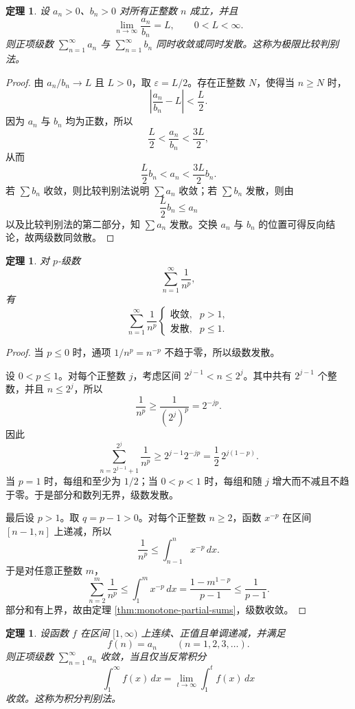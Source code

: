 \documentclass[UTF8,fontset=fandol,11pt]{ctexart}
\newtheorem{theorem}[definition]{定理}
\begin{document}
\begin{theorem}
设 $a_n>0$、$b_n>0$ 对所有正整数 $n$ 成立，并且
\[
\lim_{n\to\infty}\frac{a_n}{b_n}=L,
\qquad 0<L<\infty.
\]
则正项级数 $\sum_{n=1}^{\infty}a_n$ 与 $\sum_{n=1}^{\infty}b_n$ 同时收敛或同时发散。这称为极限比较判别法。\label{thm:limit-comparison}
\end{theorem}
\begin{proof}
由 $a_n/b_n\to L$ 且 $L>0$，取 $\varepsilon=L/2$。存在正整数 $N$，使得当 $n\geq N$ 时，
\[
\left|\frac{a_n}{b_n}-L\right|<\frac{L}{2}.
\]
因为 $a_n$ 与 $b_n$ 均为正数，所以
\[
\frac{L}{2}<\frac{a_n}{b_n}<\frac{3L}{2},
\]
从而
\[
\frac{L}{2}b_n<a_n<\frac{3L}{2}b_n.
\]
若 $\sum b_n$ 收敛，则比较判别法说明 $\sum a_n$ 收敛；若 $\sum b_n$ 发散，则由
\[
\frac{L}{2}b_n\leq a_n
\]
以及比较判别法的第二部分，知 $\sum a_n$ 发散。交换 $a_n$ 与 $b_n$ 的位置可得反向结论，故两级数同敛散。
\end{proof}
\begin{theorem}
对 $p$-级数
\[
\sum_{n=1}^{\infty}\frac{1}{n^p},
\]
有
\[
\sum_{n=1}^{\infty}\frac{1}{n^p}
\begin{cases}
\text{收敛},&p>1,\\
\text{发散},&p\leq1.
\end{cases}
\]
\label{thm:p-series}
\end{theorem}
\begin{proof}
当 $p\leq0$ 时，通项 $1/n^p=n^{-p}$ 不趋于零，所以级数发散。

设 $0<p\leq1$。对每个正整数 $j$，考虑区间 $2^{j-1}<n\leq2^j$。其中共有 $2^{j-1}$ 个整数，并且 $n\leq2^j$，所以
\[
\frac{1}{n^p}\geq\frac{1}{(2^j)^p}=2^{-jp}.
\]
因此
\[
\sum_{n=2^{j-1}+1}^{2^j}\frac{1}{n^p}
\geq 2^{j-1}2^{-jp}=\frac12\,2^{j(1-p)}.
\]
当 $p=1$ 时，每组和至少为 $1/2$；当 $0<p<1$ 时，每组和随 $j$ 增大而不减且不趋于零。于是部分和数列无界，级数发散。

最后设 $p>1$。取 $q=p-1>0$。对每个正整数 $n\geq2$，函数 $x^{-p}$ 在区间 $[n-1,n]$ 上递减，所以
\[
\frac{1}{n^p}\leq\int_{n-1}^{n}x^{-p}\,dx.
\]
于是对任意正整数 $m$，
\[
\sum_{n=2}^{m}\frac{1}{n^p}
\leq\int_{1}^{m}x^{-p}\,dx
=\frac{1-m^{1-p}}{p-1}
\leq\frac{1}{p-1}.
\]
部分和有上界，故由定理 \ref{thm:monotone-partial-sums}，级数收敛。
\end{proof}
\begin{theorem}
设函数 $f$ 在区间 $[1,\infty)$ 上连续、正值且单调递减，并满足
\[
f(n)=a_n\qquad(n=1,2,3,\ldots).
\]
则正项级数 $\sum_{n=1}^{\infty}a_n$ 收敛，当且仅当反常积分
\[
\int_{1}^{\infty}f(x)\,dx
=\lim_{t\to\infty}\int_{1}^{t}f(x)\,dx
\]
收敛。这称为积分判别法。\label{thm:integral-test}
\end{theorem}
\end{document}

